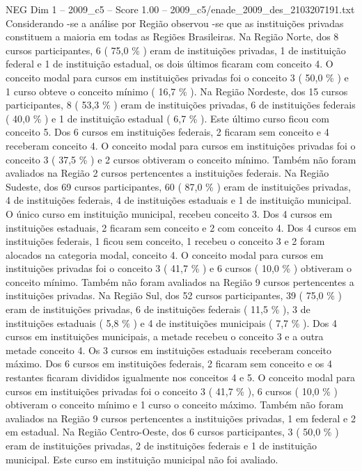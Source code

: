 \begin{textsample}{NEG Dim 1 – 2009\_c5 – Score 1.00 – 2009\_c5/enade\_2009\_des\_2103207191.txt}
Considerando -se a análise por Região observou -se que as instituições privadas constituem a maioria em todas as Regiões Brasileiras.
Na Região Norte, dos 8 cursos participantes, 6 ( 75,0 \% ) eram de instituições privadas, 1 de instituição federal e 1 de instituição estadual, os dois últimos ficaram com conceito 4.
O conceito modal para cursos em instituições privadas foi o conceito 3 ( 50,0 \% ) e 1 curso obteve o conceito mínimo ( 16,7 \% ).
Na Região Nordeste, dos 15 cursos participantes, 8 ( 53,3 \% ) eram de instituições privadas, 6 de instituições federais ( 40,0 \% ) e 1 de instituição estadual ( 6,7 \% ).
Este último curso ficou com conceito 5.
Dos 6 cursos em instituições federais, 2 ficaram sem conceito e 4 receberam conceito 4.
O conceito modal para cursos em instituições privadas foi o conceito 3 ( 37,5 \% ) e 2 cursos obtiveram o conceito mínimo.
Também não foram avaliados na Região 2 cursos pertencentes a instituições federais.
Na Região Sudeste, dos 69 cursos participantes, 60 ( 87,0 \% ) eram de instituições privadas, 4 de instituições federais, 4 de instituições estaduais e 1 de instituição municipal.
O único curso em instituição municipal, recebeu conceito 3.
Dos 4 cursos em instituições estaduais, 2 ficaram sem conceito e 2 com conceito 4.
Dos 4 cursos em instituições federais, 1 ficou sem conceito, 1 recebeu o conceito 3 e 2 foram alocados na categoria modal, conceito 4.
O conceito modal para cursos em instituições privadas foi o conceito 3 ( 41,7 \% ) e 6 cursos ( 10,0 \% ) obtiveram o conceito mínimo.
Também não foram avaliados na Região 9 cursos pertencentes a instituições privadas.
Na Região Sul, dos 52 cursos participantes, 39 ( 75,0 \% ) eram de instituições privadas, 6 de instituições federais ( 11,5 \% ), 3 de instituições estaduais ( 5,8 \% ) e 4 de instituições municipais ( 7,7 \% ).
Dos 4 cursos em instituições municipais, a metade recebeu o conceito 3 e a outra metade conceito 4.
Os 3 cursos em instituições estaduais receberam conceito máximo.
Dos 6 cursos em instituições federais, 2 ficaram sem conceito e os 4 restantes ficaram divididos igualmente nos conceitos 4 e 5.
O conceito modal para cursos em instituições privadas foi o conceito 3 ( 41,7 \% ), 6 cursos ( 10,0 \% ) obtiveram o conceito mínimo e 1 curso o conceito máximo.
Também não foram avaliados na Região 9 cursos pertencentes a instituições privadas, 1 em federal e 2 em estadual.
Na Região Centro-Oeste, dos 6 cursos participantes, 3 ( 50,0 \% ) eram de instituições privadas, 2 de instituições federais e 1 de instituição municipal.
Este curso em instituição municipal não foi avaliado.

\end{textsample}
